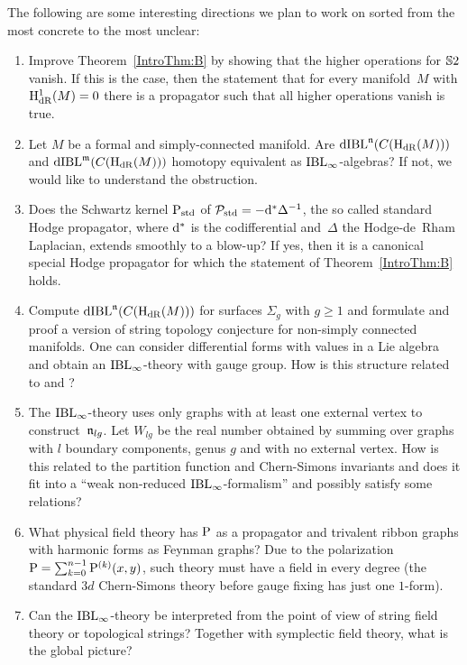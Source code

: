 \documentclass[\MainFolder/Text.tex]{subfiles}
\begin{document}
The following are some interesting directions we plan to work on sorted from the most concrete to the most unclear:

\begin{enumerate}[label=(\arabic*)]
\item Improve Theorem~\ref{IntroThm:B} by showing that the higher operations for $\mathbb{S}{2}$ vanish. If this is the case, then the statement that for every manifold~$M$ with $\mathrm{H}_{\mathrm{dR}}^1(M)=0$ there is a propagator such that all higher operations vanish is true.
\item Let $M$ be a formal and simply-connected manifold. Are  $\mathrm{dIBL}^{\mathfrak{n}}(C(\mathrm{H}_{\mathrm{dR}}(M)))$ and $\mathrm{dIBL}^{\mathfrak{m}}(C(\mathrm{H}_{\mathrm{dR}}(M)))$ homotopy equivalent as $\mathrm{IBL}_\infty$-algebras? If not, we would like to understand the obstruction. 
\item Does the Schwartz kernel $\mathrm{P}_{\mathrm{std}}$ of $\mathcal{P}_{\mathrm{std}}=-\mathrm{d}^* \Delta^{-1}$, the so called standard Hodge propagator, where $\mathrm{d}^*$ is the codifferential and~$\Delta$ the Hodge-de~Rham Laplacian, extends smoothly to a blow-up? If yes, then it is a canonical special Hodge propagator for which the statement of Theorem~\ref{IntroThm:B} holds.
\item Compute $\mathrm{dIBL}^{\mathfrak{n}}(C(\mathrm{H}_{\mathrm{dR}}(M)))$ for surfaces $\Sigma_g$ with $g\ge 1$ and formulate and proof a version of string topology conjecture for non-simply connected manifolds. One can consider differential forms with values in a Lie algebra and obtain an $\mathrm{IBL}_\infty$-theory with gauge group. How is this structure related to \cite{Goldman1986} and \cite{Andersen1996}?
\item The $\mathrm{IBL}_\infty$-theory uses only graphs with at least one external vertex to construct~$\mathfrak{n}_{lg}$. Let $W_{lg}$ be the real number obtained by summing over graphs with $l$ boundary components, genus $g$ and with no external vertex. How is this related to the partition function and Chern-Simons invariants and does it fit into a ``weak non-reduced $\mathrm{IBL}_\infty$-formalism'' and possibly satisfy some relations?
\item What physical field theory has $\mathrm{P}$ as a propagator and trivalent ribbon graphs with harmonic forms as Feynman graphs?
Due to the polarization $\mathrm{P} = \sum_{k=0}^{n-1}\mathrm{P}^{(k)}(x,y)$, such theory must have a field in every degree (the standard $3d$ Chern-Simons theory before gauge fixing has just one $1$-form).
\item Can the $\mathrm{IBL}_\infty$-theory be interpreted from the point of view of string field theory or topological strings? Together with symplectic field theory, what is the global picture?
\end{enumerate}
\end{document}
